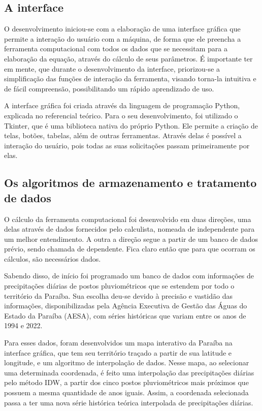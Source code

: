 \subsection{A interface}

O desenvolvimento iniciou-se com a elaboração de uma interface gráfica que permite a interação do usuário com a máquina, de forma que ele preencha a ferramenta computacional com todos os dados que se necessitam para a elaboração da equação, através do cálculo de seus parâmetros. É importante ter em mente, que durante o desenvolvimento da interface, priorizou-se a simplificação das funções de interação da ferramenta, visando torna-la intuitiva e de fácil compreensão, possibilitando um rápido aprendizado de uso.

A interface gráfica foi criada através da linguagem de programação Python, explicada no referencial teórico. Para o seu desenvolvimento, foi utilizado o Tkinter, que é uma biblioteca nativa do próprio Python. Ele permite a criação de telas, botões, tabelas, além de outras ferramentas. Através delas é possível a interação do usuário, pois todas as suas solicitações passam primeiramente por elas.

\subsection{Os algoritmos de armazenamento e tratamento de dados}

O cálculo da ferramenta computacional foi desenvolvido em duas direções, uma delas através de dados fornecidos pelo calculista, nomeada de independente para um melhor entendimento. A outra a direção segue a partir de um banco de dados prévio, sendo chamada de dependente. Fica claro então que para que ocorram os cálculos, são necessários dados.

Sabendo disso, de início foi programado um banco de dados com informações de precipitações diárias de postos pluviométricos que se estendem por todo o território da Paraíba. Sua escolha deu-se devido à precisão e vastidão das informações, disponibilizadas pela Agência Executiva de Gestão das Águas do Estado da Paraíba (AESA), com séries históricas que variam entre os anos de 1994 e 2022.

Para esses dados, foram desenvolvidos um mapa interativo da Paraíba na interface gráfica, que tem seu território traçado a partir de sua latitude e longitude, e um algoritmo de interpolação de dados. Nesse mapa, ao selecionar uma determinada coordenada, é feito uma interpolação das precipitações diárias pelo método IDW, a partir dos cinco postos pluviométricos mais próximos que possuem a mesma quantidade de anos iguais. Assim, a coordenada selecionada passa a ter uma nova série histórica teórica interpolada de precipitações diárias. 

